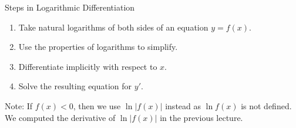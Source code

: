 \begin{frame}
Steps in Logarithmic Differentiation
\begin{enumerate}
\item  Take natural logarithms of both sides of an equation $y = f(x)$.
\item  Use the properties of logarithms to simplify.
\item  Differentiate implicitly with respect to $x$.
\item  Solve the resulting equation for $y'$.
\end{enumerate}
Note: If $f(x) < 0$, then we use $\ln |f(x)|$ instead as $\ln f(x)$ is not defined. We computed the derivative of $\ln |f(x)|$ in the previous lecture.
\end{frame}
